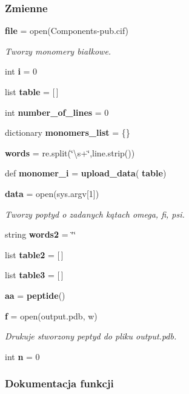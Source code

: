 \subsubsection*{Zmienne}
\begin{DoxyCompactItemize}
\item 
\textbf{ file} = open(\textquotesingle{}Components-\/pub.\+cif\textquotesingle{})
\begin{DoxyCompactList}\small\item\em Tworzy monomery białkowe. \end{DoxyCompactList}\item 
int \textbf{ i} = 0
\item 
list \textbf{ table} = [$\,$]
\item 
int \textbf{ number\+\_\+of\+\_\+lines} = 0
\item 
dictionary \textbf{ monomers\+\_\+list} = \{\}
\item 
\textbf{ words} = re.\+split(\char`\"{}\textbackslash{}s+\char`\"{},line.\+strip())
\item 
def \textbf{ monomer\+\_\+i} = \textbf{ upload\+\_\+data}(\textbf{ table})
\item 
\textbf{ data} = open(sys.\+argv[1])
\begin{DoxyCompactList}\small\item\em Tworzy poptyd o zadanych kątach omega, fi, psi. \end{DoxyCompactList}\item 
string \textbf{ words2} = \char`\"{}\char`\"{}
\item 
list \textbf{ table2} = [$\,$]
\item 
list \textbf{ table3} = [$\,$]
\item 
\textbf{ aa} = \textbf{ peptide}()
\item 
\textbf{ f} = open(\textquotesingle{}output.\+pdb\textquotesingle{}, \textquotesingle{}w\textquotesingle{})
\begin{DoxyCompactList}\small\item\em Drukuje stworzony peptyd do pliku output.\+pdb. \end{DoxyCompactList}\item 
int \textbf{ n} = 0
\end{DoxyCompactItemize}


\subsubsection{Dokumentacja funkcji}
\mbox{\label{namespaceprogram_a1a5eb7e0796234b56f3f8aaf1d224e91}} 
